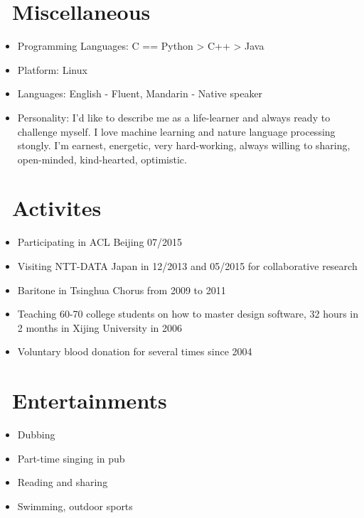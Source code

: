 \documentclass{resume}
\begin{document}
\section{\faCogs\ Miscellaneous}
\begin{itemize}[parsep=0.5ex]
  \item Programming Languages: C == Python > C++ > Java
  \item Platform: Linux
  \item Languages: English - Fluent, Mandarin - Native speaker
  \item Personality: I'd like to describe me as a life-learner and always ready to challenge myself. I love machine learning and nature language processing stongly. I'm earnest, energetic, very hard-working, always willing to sharing, open-minded, kind-hearted, optimistic.
\end{itemize}
\section{\faMapMarker\ Activites}
\begin{itemize}[parsep=0.5ex]
\item Participating in ACL Beijing 07/2015
\item Visiting NTT-DATA Japan in 12/2013 and 05/2015 for collaborative research
\item Baritone in Tsinghua Chorus from 2009 to 2011
\item Teaching 60-70 college students on how to master design software, 32 hours in 2 months in Xijing University in 2006
\item Voluntary blood donation for several times since 2004
\end{itemize}
\section{\faHeartO\ Entertainments }
\begin{itemize}[parsep=0.5ex]
\item Dubbing
\item Part-time singing in pub
\item Reading and sharing
\item Swimming, outdoor sports
\end{itemize}

%
%
\end{document}
